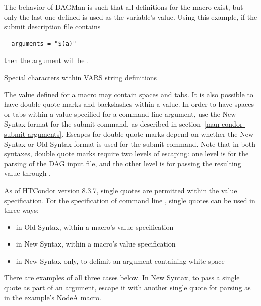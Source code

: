 The behavior of DAGMan is such that all definitions for the macro exist,
but only the last one defined is used as the variable's value.
Using this example, 
if the  submit description file contains
\begin{verbatim}
  arguments = "$(a)"
\end{verbatim}
then the argument will be .

\begin{description}
\item[Special characters within VARS string definitions]
\end{description}

The value defined for a macro may contain spaces and tabs.
It is also possible to have double quote marks and
backslashes within a value.
In order to have spaces or tabs within a value specified for a command line
argument,
use the New Syntax format for the  submit command,
as described in section~\ref{man-condor-submit-arguments}.
Escapes for double quote marks
depend on whether the New Syntax or Old Syntax format is used
for the  submit command.
Note that in both syntaxes,
double quote marks require two levels of escaping:
one level is for the parsing of the DAG input file, and the other level is for
passing the resulting value through .

As of HTCondor version 8.3.7, 
single quotes are permitted within the value specification.  
For the specification of command line , 
single quotes can be used in three ways:
\begin{itemize}
\item in Old Syntax, within a macro's value specification
\item in New Syntax, within a macro's value specification
\item in New Syntax only, to delimit an argument containing white space 
\end{itemize}
There are examples of all three cases below.  
In New Syntax, 
to pass a single quote as part of an argument, 
escape it with another single quote
for  parsing as in the example's NodeA  macro.

